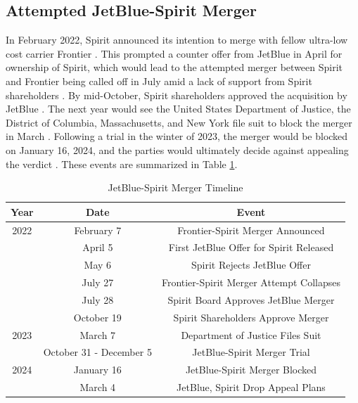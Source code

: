 \documentclass{article}
\begin{document}
	\subsection{Attempted JetBlue-Spirit Merger}
	\label{sec:Setting_Merger}
	In February 2022, Spirit announced its intention to merge with fellow ultra-low cost carrier Frontier \citep{schaper_frontier-spirit_2022}. This prompted a counter offer from JetBlue in April for ownership of Spirit, which would lead to the attempted merger between Spirit and Frontier being called off in July amid a lack of support from Spirit shareholders \citep{josephs_jetblue_2022, josephs_spirit_2022}. By mid-October, Spirit shareholders approved the acquisition by JetBlue \citep{koenig_spirit_2022}. The next year would see the United States Department of Justice, the District of Columbia, Massachusetts, and New York file suit to block the merger in March \citep{chokshi_justice_2023}. Following a trial in the winter of 2023, the merger would be blocked on January 16, 2024, and the parties would ultimately decide against appealing the verdict \citep{chapman_jetblue_2024}.  These events are summarized in Table \ref{tab:JetBlue_Spirit_Timeline}. 

    	\begin{table}[tb]
		\caption{JetBlue-Spirit Merger Timeline}
		\label{tab:JetBlue_Spirit_Timeline}
		\begin{center}
			\begin{tabular}{ccc}
				\hline
				Year & Date & Event \\
				\hline
				2022 & February 7 & Frontier-Spirit Merger Announced \\
				& April 5 &  First JetBlue Offer for Spirit Released\\
				& May 6 & Spirit Rejects JetBlue Offer \\
				& July 27 &  Frontier-Spirit Merger Attempt Collapses\\
				& July 28 &  Spirit Board Approves JetBlue Merger\\
				& October 19 & Spirit Shareholders Approve Merger \\
				\hline
				2023 & March 7 &  Department of Justice Files Suit\\
				& October 31 - December 5 &  JetBlue-Spirit Merger Trial \\
				\hline
				2024 & January 16 & JetBlue-Spirit Merger Blocked \\
				& March 4 & JetBlue, Spirit Drop Appeal Plans \\
			\end{tabular}
		\end{center}
	\end{table}
\end{document}
